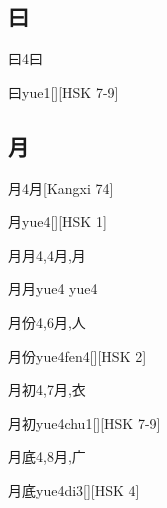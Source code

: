 \subsection*{曰}

\begin{Entry}{曰}{4}{⽈}
  \begin{Phonetics}{曰}{yue1}[][HSK 7-9]
  \end{Phonetics}
\end{Entry}

\subsection*{月}

\begin{Entry}{月}{4}{⽉}[Kangxi 74]
  \begin{Phonetics}{月}{yue4}[][HSK 1]
  \end{Phonetics}
\end{Entry}

\begin{Entry}{月月}{4,4}{⽉,⽉}
  \begin{Phonetics}{月月}{yue4 yue4}
  \end{Phonetics}
\end{Entry}

\begin{Entry}{月份}{4,6}{⽉,⼈}
  \begin{Phonetics}{月份}{yue4fen4}[][HSK 2]
  \end{Phonetics}
\end{Entry}

\begin{Entry}{月初}{4,7}{⽉,⾐}
  \begin{Phonetics}{月初}{yue4chu1}[][HSK 7-9]
  \end{Phonetics}
\end{Entry}

\begin{Entry}{月底}{4,8}{⽉,⼴}
  \begin{Phonetics}{月底}{yue4di3}[][HSK 4]
  \end{Phonetics}
\end{Entry}

